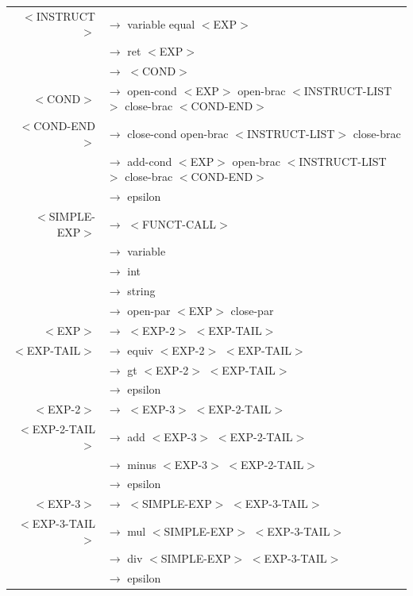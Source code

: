 \documentclass[a4paper,10pt]{article}
\begin{document}
\begin{tabular}{rl}
	$<$INSTRUCT$>$				& $\rightarrow$ variable equal $<$EXP$>$ \\
								& $\rightarrow$ ret $<$EXP$>$ \\
								& $\rightarrow$ $<$COND$>$ \\
	$<$COND$>$					& $\rightarrow$ open-cond $<$EXP$>$ open-brac $<$INSTRUCT-LIST$>$ close-brac $<$COND-END$>$ \\
	$<$COND-END$>$				& $\rightarrow$ close-cond open-brac $<$INSTRUCT-LIST$>$ close-brac \\
								& $\rightarrow$ add-cond $<$EXP$>$ open-brac $<$INSTRUCT-LIST$>$ close-brac $<$COND-END$>$ \\
								& $\rightarrow$ epsilon \\
	$<$SIMPLE-EXP$>$			& $\rightarrow$ $<$FUNCT-CALL$>$ \\
								& $\rightarrow$ variable \\
								& $\rightarrow$ int \\
								& $\rightarrow$ string \\
								& $\rightarrow$ open-par $<$EXP$>$ close-par \\
	$<$EXP$>$					& $\rightarrow$ $<$EXP-2$>$ $<$EXP-TAIL$>$ \\
	$<$EXP-TAIL$>$				& $\rightarrow$ equiv $<$EXP-2$>$ $<$EXP-TAIL$>$ \\
								& $\rightarrow$ gt $<$EXP-2$>$ $<$EXP-TAIL$>$ \\
								& $\rightarrow$ epsilon \\
	$<$EXP-2$>$					& $\rightarrow$ $<$EXP-3$>$ $<$EXP-2-TAIL$>$ \\
	$<$EXP-2-TAIL$>$			& $\rightarrow$ add $<$EXP-3$>$ $<$EXP-2-TAIL$>$ \\
								& $\rightarrow$ minus $<$EXP-3$>$ $<$EXP-2-TAIL$>$ \\
								& $\rightarrow$ epsilon \\
	$<$EXP-3$>$					& $\rightarrow$ $<$SIMPLE-EXP$>$ $<$EXP-3-TAIL$>$ \\
	$<$EXP-3-TAIL$>$			& $\rightarrow$ mul $<$SIMPLE-EXP$>$ $<$EXP-3-TAIL$>$ \\
								& $\rightarrow$ div $<$SIMPLE-EXP$>$ $<$EXP-3-TAIL$>$ \\
								& $\rightarrow$ epsilon \\
					
					
\end{tabular}


\pagebreak
\end{document}
